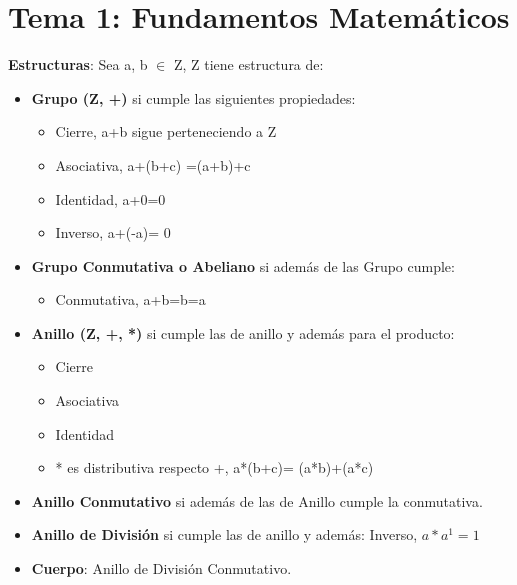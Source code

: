 \documentclass[12pt, twoside, openright]{report} %
\begin{document}





\chapter{Tema 1: Fundamentos Matemáticos}

  \textbf{Estructuras}: Sea a, b $\in$ Z, Z tiene estructura de:
  

  \begin{itemize}
  \item \textbf{Grupo (Z, +)} si cumple las siguientes propiedades:
    

    \begin{itemize}
    \item Cierre, a+b sigue perteneciendo a Z
      
    \item Asociativa, a+(b+c) =(a+b)+c
      
    \item Identidad, a+0=0
      
    \item Inverso, a+(-a)= 0
      
    \end{itemize}
  \item \textbf{Grupo Conmutativa o Abeliano} si además de las Grupo cumple:
    

    \begin{itemize}
    \item Conmutativa, a+b=b=a
      
    \end{itemize}
  \item \textbf{Anillo (Z, +, *)} si cumple las de anillo y además para el
    producto:
    

    \begin{itemize}
    \item Cierre
      
    \item Asociativa
      
    \item Identidad
      
    \item * es distributiva respecto +, a*(b+c)= (a*b)+(a*c)
      
    \end{itemize}
  \item \textbf{Anillo Conmutativo} si además de las de Anillo cumple la
    conmutativa.
    
  \item \textbf{Anillo de División} si cumple las de anillo y además:
    Inverso, $a*a^1=1$
    
  \item \textbf{Cuerpo}: Anillo de División Conmutativo.
    
  \end{itemize}
\end{document}
